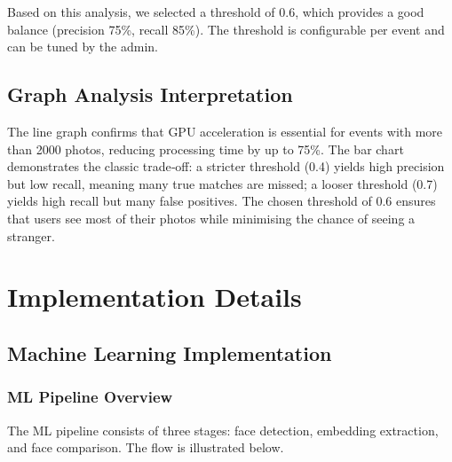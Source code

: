 \documentclass[12pt,a4paper]{article}
\begin{document}
Based on this analysis, we selected a threshold of 0.6, which provides a good balance (precision 75\%, recall 85\%). The threshold is configurable per event and can be tuned by the admin.

\subsection{Graph Analysis Interpretation}
The line graph confirms that GPU acceleration is essential for events with more than 2000 photos, reducing processing time by up to 75\%. The bar chart demonstrates the classic trade‑off: a stricter threshold (0.4) yields high precision but low recall, meaning many true matches are missed; a looser threshold (0.7) yields high recall but many false positives. The chosen threshold of 0.6 ensures that users see most of their photos while minimising the chance of seeing a stranger.

\newpage

\section{Implementation Details}

\subsection{Machine Learning Implementation}

\subsubsection{ML Pipeline Overview}
The ML pipeline consists of three stages: face detection, embedding extraction, and face comparison. The flow is illustrated below.

\begin{center}
\end{center}
\end{document}
